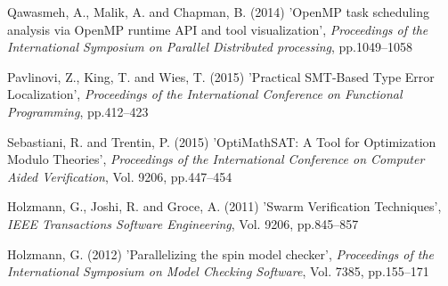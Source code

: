 \documentclass{doublecol-new}
\theoremstyle{TH}{
\newtheorem{lemma}{Lemma}
\newtheorem{theorem}[lemma]{Theorem}
\newtheorem{corrolary}[lemma]{Corrolary}
\newtheorem{conjecture}[lemma]{Conjecture}
\newtheorem{proposition}[lemma]{Proposition}
\newtheorem{claim}[lemma]{Claim}
\newtheorem{stheorem}[lemma]{Wrong Theorem}
\newtheorem{algorithm}{Algorithm}
}
\theoremstyle{THrm}{
\newtheorem{definition}{Definition}[section]
\newtheorem{question}{Question}[section]
\newtheorem{remark}{Remark}
\newtheorem{scheme}{Scheme}
}
\theoremstyle{THhit}{
\newtheorem{case}{Case}[section]
}
\begin{document}
\begin{thebibliography}{10}
Qawasmeh, A., Malik, A. and Chapman, B. (2014) 'OpenMP task scheduling analysis via OpenMP runtime API and tool visualization', {\it Proceedings of the International Symposium on Parallel Distributed processing}, pp.1049--1058

Pavlinovi, Z., King, T. and Wies, T. (2015) 'Practical SMT-Based Type Error Localization', {\it Proceedings of the International Conference on Functional Programming}, pp.412--423

Sebastiani, R. and Trentin, P. (2015) 'OptiMathSAT: A Tool for Optimization Modulo Theories', {\it Proceedings of the International Conference on Computer Aided Verification}, Vol. 9206, pp.447--454

Holzmann, G., Joshi, R. and Groce, A. (2011) 'Swarm Verification Techniques', {\it IEEE Transactions Software Engineering}, Vol. 9206, pp.845--857

Holzmann, G. (2012) 'Parallelizing the spin model checker', {\it Proceedings of the International Symposium on Model Checking Software}, Vol. 7385, pp.155--171

\end{thebibliography}
\end{document}
